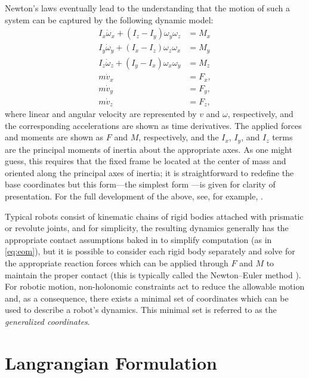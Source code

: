 Newton's laws eventually lead to the understanding that the motion of such a
system can be captured by the following dynamic model:
\begin{align*}
  I_{x} \dot{\omega}_{x} + (I_{z} - I_{y}) \omega_{y} \omega_{z} &= M_{x}\\
  I_{y} \dot{\omega}_{y} + (I_{x} - I_{z}) \omega_{z} \omega_{x} &= M_{y}\\
  I_{z} \dot{\omega}_{z} + (I_{y} - I_{x}) \omega_{x} \omega_{y} &= M_{z}\\
  m \dot{v}_{x} &= F_{x},\\
  m \dot{v}_{y} &= F_{y},\\
  m \dot{v}_{z} &= F_{z},
\end{align*}
where linear and angular velocity are represented by $v$ and $\omega$,
respectively, and the corresponding accelerations are shown as time
derivatives.
%
The applied forces and moments are shown as $F$ and $M$, respectively, and the
$I_{x}$, $I_{y}$, and $I_{z}$ terms are the principal moments of inertia about
the appropriate axes.
%
As one might guess, this requires that the fixed frame be located at the center
of mass and oriented along the principal axes of inertia; it is straightforward
to redefine the base coordinates but this form---the simplest form ---is given
for clarity of presentation.
%
For the full development of the above, see, for example,
\cite[Ch. 8]{Baruh1998}.


Typical robots consist of kinematic chains of rigid bodies attached with
prismatic or revolute joints, and for simplicity, the resulting dynamics
generally has the appropriate contact assumptions baked in to simplify
computation (as in \eqref{eq:eom}), but it is possible to consider
each rigid body separately and solve for the appropriate reaction forces which
can be applied through $F$ and $M$ to maintain the proper contact (this is
typically called the Newton--Euler method \cite{Hollerbach1980}).
%
For robotic motion, non-holonomic constraints act to reduce the allowable motion
and, as a consequence, there exists a minimal set of coordinates which can be
used to describe a robot's dynamics.
%
This minimal set is referred to as the {\em generalized coordinates}.


\section{Langrangian Formulation}


